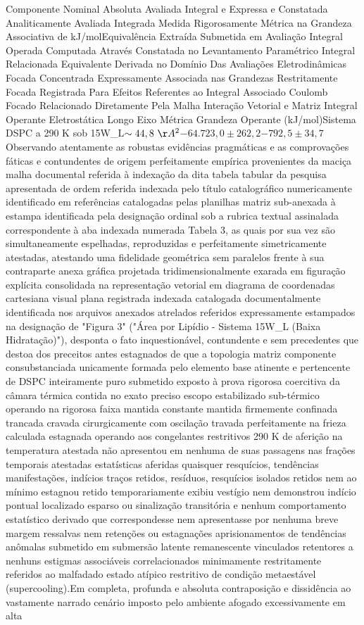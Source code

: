 Componente Nominal Absoluta Avaliada Integral e Expressa e Constatada Analiticamente Avaliada Integrada Medida Rigorosamente Métrica na Grandeza Associativa de kJ/molEquivalência Extraída Submetida em Avaliação Integral Operada Computada Através Constatada no Levantamento Paramétrico Integral Relacionada Equivalente Derivada no Domínio Das Avaliações Eletrodinâmicas Focada Concentrada Expressamente Associada nas Grandezas Restritamente Focada Registrada Para Efeitos Referentes ao Integral Associado Coulomb Focado Relacionado Diretamente Pela Malha Interação Vetorial e Matriz Integral Operante Eletrostática Longo Eixo Métrica Grandeza Operante (kJ/mol)Sistema DSPC a 290 K sob 15W\_L$\sim44,8~\AA^2$$-64.723,0 \pm 262,2$$-792,5 \pm 34,7$Observando atentamente as robustas evidências pragmáticas e as comprovações fáticas e contundentes de origem perfeitamente empírica provenientes da maciça malha documental referida à indexação da dita tabela tabular da pesquisa apresentada de ordem referida indexada pelo título catalográfico numericamente identificado em referências catalogadas pelas planilhas matriz sub-anexada à estampa identificada pela designação ordinal sob a rubrica textual assinalada correspondente à aba indexada numerada Tabela 3, as quais por sua vez são simultaneamente espelhadas, reproduzidas e perfeitamente simetricamente atestadas, atestando uma fidelidade geométrica sem paralelos frente à sua contraparte anexa gráfica projetada tridimensionalmente exarada em figuração explícita consolidada na representação vetorial em diagrama de coordenadas cartesiana visual plana registrada indexada catalogada documentalmente identificada nos arquivos anexados atrelados referidos expressamente estampados na designação de "Figura 3" ("Área por Lipídio - Sistema 15W\_L (Baixa Hidratação)"), desponta o fato inquestionável, contundente e sem precedentes que destoa dos preceitos antes estagnados de que a topologia matriz componente consubstanciada unicamente formada pelo elemento base atinente e pertencente de DSPC inteiramente puro submetido exposto à prova rigorosa coercitiva da câmara térmica contida no exato preciso escopo estabilizado sub-térmico operando na rigorosa faixa mantida constante mantida firmemente confinada trancada cravada cirurgicamente com oscilação travada perfeitamente na frieza calculada estagnada operando aos congelantes restritivos 290 K de aferição na temperatura atestada não apresentou em nenhuma de suas passagens nas frações temporais atestadas estatísticas aferidas quaisquer resquícios, tendências manifestações, indícios traços retidos, resíduos, resquícios isolados retidos nem ao mínimo estagnou retido temporariamente exibiu vestígio nem demonstrou indício pontual localizado esparso ou sinalização transitória e nenhum comportamento estatístico derivado que correspondesse nem apresentasse por nenhuma breve margem ressalvas nem retenções ou estagnações aprisionamentos de tendências anômalas submetido em submersão latente remanescente vinculados retentores a nenhuns estigmas associáveis correlacionados minimamente restritamente referidos ao malfadado estado atípico restritivo de condição metaestável (supercooling).Em completa, profunda e absoluta contraposição e dissidência ao vastamente narrado cenário imposto pelo ambiente afogado excessivamente em alta 